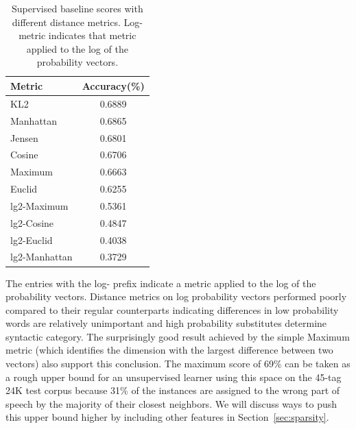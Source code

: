 \documentclass[11pt]{article}
\begin{document}
\begin{table}[ht] \centering
\begin{tabular}{|l|c|}
\hline
Metric & Accuracy(\%) \\
\hline
KL2 & 0.6889 \\
Manhattan & 0.6865 \\
Jensen & 0.6801 \\
Cosine & 0.6706 \\
Maximum & 0.6663 \\
Euclid & 0.6255 \\
lg2-Maximum & 0.5361 \\
lg2-Cosine & 0.4847 \\
lg2-Euclid & 0.4038 \\
lg2-Manhattan & 0.3729 \\
\hline
\end{tabular}
\caption{Supervised baseline scores with different distance metrics.
  Log-metric indicates that metric applied to the log of the
  probability vectors.}
\label{tab:distscores}
\end{table}



The entries with the log- prefix indicate a metric applied to the log
of the probability vectors.  Distance metrics on log probability
vectors performed poorly compared to their regular counterparts
indicating differences in low probability words are relatively
unimportant and high probability substitutes determine syntactic
category.  The surprisingly good result achieved by the simple Maximum
metric (which identifies the dimension with the largest difference
between two vectors) also support this conclusion.  The maximum score
of 69\% can be taken as a rough upper bound for an unsupervised
learner using this space on the 45-tag 24K test corpus because 31\% of
the instances are assigned to the wrong part of speech by the majority
of their closest neighbors.  We will discuss ways to push this upper
bound higher by including other features in
Section~\ref{sec:sparsity}.
\end{document}
